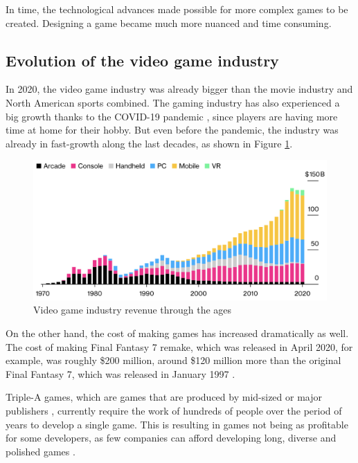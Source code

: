In time, the technological advances made possible for more complex games to be created. Designing a game became much more nuanced and time consuming. 

\subsection{Evolution of the video game industry}

In 2020, the video game industry was already bigger than the movie industry and North American sports combined. The gaming industry has also experienced a big growth thanks to the COVID-19 pandemic \cite{marketwatch:2019}, since players are having more time at home for their hobby. But even before the pandemic, the industry was already in fast-growth along the last decades, as shown in Figure \ref{fig:growth_graph}.

\begin{figure}[h]
    \caption{Video game industry revenue through the ages}
    \centerline{\includegraphics[width=13cm]{images/introduction/industry_growth.png}}
    \label{fig:growth_graph}
\end{figure}

On the other hand, the cost of making games has increased dramatically as well. The cost of making Final Fantasy 7 remake, which was released in April 2020, for example, was roughly \$200 million, around \$120 million more than the original Final Fantasy 7, which was released in January 1997 \cite{cbr:2021}.

Triple-A games, which are games that are produced by mid-sized or major publishers \cite{steinberg:2007}, currently require the work of hundreds of people over the period of years to develop a single game. This is resulting in games not being as profitable for some developers, as few companies can afford developing long, diverse and polished games \cite{shaker:2016}.

